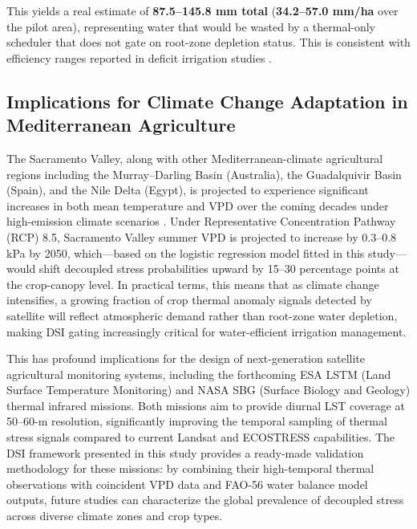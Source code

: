 \documentclass[review,12pt]{elsarticle}
\begin{document}
This yields a real estimate of \textbf{87.5--145.8 mm total} (\textbf{34.2--57.0 mm/ha} over the pilot area), representing water that would be wasted by a thermal-only scheduler that does not gate on root-zone depletion status. This is consistent with efficiency ranges reported in deficit irrigation studies \citep{fereres2007deficit, turner2007relationships}.

\subsection{Implications for Climate Change Adaptation in Mediterranean Agriculture}
\label{subsec:climate_implications}

The Sacramento Valley, along with other Mediterranean-climate agricultural regions including the Murray--Darling Basin (Australia), the Guadalquivir Basin (Spain), and the Nile Delta (Egypt), is projected to experience significant increases in both mean temperature and VPD over the coming decades under high-emission climate scenarios \citep{gerhards2019challenges}. Under Representative Concentration Pathway (RCP) 8.5, Sacramento Valley summer VPD is projected to increase by 0.3--0.8 kPa by 2050, which---based on the logistic regression model fitted in this study---would shift decoupled stress probabilities upward by 15--30 percentage points at the crop-canopy level. In practical terms, this means that as climate change intensifies, a growing fraction of crop thermal anomaly signals detected by satellite will reflect atmospheric demand rather than root-zone water depletion, making DSI gating increasingly critical for water-efficient irrigation management.

This has profound implications for the design of next-generation satellite agricultural monitoring systems, including the forthcoming ESA LSTM (Land Surface Temperature Monitoring) and NASA SBG (Surface Biology and Geology) thermal infrared missions. Both missions aim to provide diurnal LST coverage at 50--60-m resolution, significantly improving the temporal sampling of thermal stress signals compared to current Landsat and ECOSTRESS capabilities. The DSI framework presented in this study provides a ready-made validation methodology for these missions: by combining their high-temporal thermal observations with coincident VPD data and FAO-56 water balance model outputs, future studies can characterize the global prevalence of decoupled stress across diverse climate zones and crop types.
\end{document}

